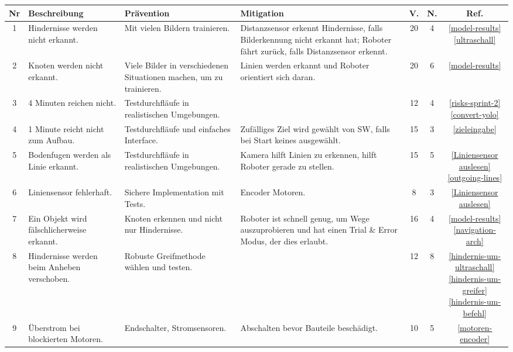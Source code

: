 \begin{table}[H]
\centering
\small
\begin{tabularx}{\textwidth}{|c|X|X|X|c|c|c|}
\hline
  \textbf{Nr} & \textbf{Beschreibung} & \textbf{Prävention} & \textbf{Mitigation} & \textbf{V.} & \textbf{N.} & \textbf{Ref.}\\
  \hline
      1&Hindernisse werden nicht erkannt. &Mit vielen Bildern trainieren.& Distanzsensor erkennt Hindernisse, falls Bilderkennung nicht erkannt hat; Roboter fährt zurück, falls Distanzsensor erkennt.&20&4& \makecell{\ref{model-results}\\ \ref{ultraschall}} \\
  \hline
2&Knoten werden nicht erkannt. &Viele Bilder in verschiedenen Situationen machen, um zu trainieren.&Linien werden erkannt und Roboter orientiert sich daran.&20& 6&\ref{model-results}\\
  \hline
      3&4 Minuten reichen nicht. &Testdurchfläufe in realistischen Umgebungen.&&12&4 &\makecell{\ref{risks-sprint-2}\\ \ref{convert-yolo}}\\
  \hline
      4& 1 Minute reicht nicht zum Aufbau.& Testdurchfläufe und einfaches Interface.&Zufälliges Ziel wird gewählt von SW, falls bei Start keines ausgewählt.&15&3 &\ref{zieleingabe}\\
  \hline
      5&Bodenfugen werden als Linie erkannt. & Testdurchfläufe in realistischen Umgebungen.&Kamera hilft Linien zu erkennen, hilft Roboter gerade zu stellen.&15&5& \makecell{\ref{Liniensensor auslesen} \\ \ref{outgoing-lines}}\\
  \hline
      6& Liniensensor fehlerhaft. &Sichere Implementation mit Tests.& Encoder Motoren.&8&3 &\ref{Liniensensor auslesen}\\
  \hline
      7& Ein Objekt wird fälschlicherweise erkannt. &Knoten erkennen und nicht nur Hindernisse.&Roboter ist schnell genug, um Wege auszuprobieren und hat einen Trial \& Error Modus, der dies erlaubt.&16&4& \makecell{\ref{model-results} \\ \ref{navigation-arch}}
\\
  \hline
      8&Hindernisse werden beim Anheben verschoben. &Robuste Greifmethode wählen und testen.&&12&8& \makecell{\ref{hindernis-um-ultraschall} \\ \ref{hindernis-um-greifer} \\ \ref{hindernis-um-befehl}}
\\
  \hline
      9&Überstrom bei blockierten Motoren. &Endschalter, Stromsensoren.&Abschalten bevor Bauteile beschädigt.&10&5& \ref{motoren-encoder} \\

\end{tabularx}
\end{table}
